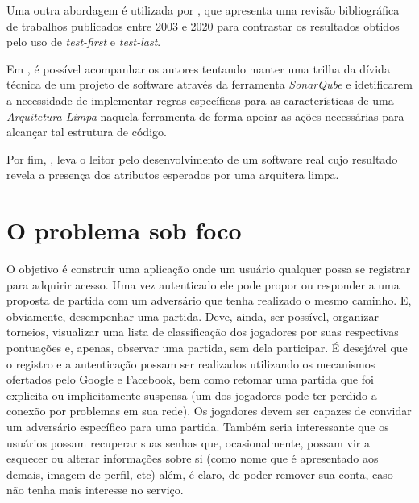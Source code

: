   \cite{Milanez2014}

  \cite{Santos2015}

  \cite{Aguilar2016}

  \cite{Gustavsson2017}

  \cite{Adhikari2019}

  \cite{Benato2021}
  Uma outra abordagem é utilizada por , que apresenta uma revisão bibliográfica de trabalhos publicados entre 2003 e 2020 para contrastar os resultados obtidos pelo uso de \emph{test-first} e \emph{test-last}.

  \cite{Beltrao2020}
  Em , é possível acompanhar os autores tentando manter uma trilha da dívida técnica de um projeto de software através da ferramenta \emph{SonarQube} e idetificarem a necessidade de implementar regras específicas para as características de uma \emph{Arquitetura Limpa} naquela ferramenta de forma apoiar as ações necessárias para alcançar tal estrutura de código.

  \cite{Souza2021}
  Por fim, , leva o leitor pelo desenvolvimento de um software real cujo resultado revela a presença dos atributos esperados por uma arquitera limpa.

\section{O problema sob foco}

  O objetivo é construir uma aplicação onde um usuário qualquer possa se registrar para adquirir acesso. Uma vez autenticado ele pode propor ou responder a uma proposta de partida com um adversário que tenha realizado o mesmo caminho. E, obviamente, desempenhar uma partida. Deve, ainda, ser possível, organizar torneios, visualizar uma lista de classificação dos jogadores por suas respectivas pontuações e, apenas, observar uma partida, sem dela participar. É desejável que o registro e a autenticação possam ser realizados utilizando os mecanismos ofertados pelo Google e Facebook, bem como retomar uma partida que foi explicita ou implicitamente suspensa (um dos jogadores pode ter perdido a conexão por problemas em sua rede). Os jogadores devem ser capazes de convidar um adversário específico para uma partida. Também seria interessante que os usuários possam recuperar suas senhas que, ocasionalmente, possam vir a esquecer ou alterar informações sobre si (como nome que é apresentado aos demais, imagem de perfil, etc) além, é claro, de poder remover sua conta, caso não tenha mais interesse no serviço.

